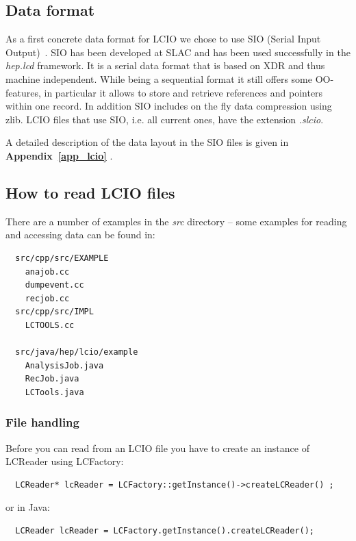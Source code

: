 \documentclass[twoside]{article}
\begin{document}
\subsection{Data format \label{sec_sio}}

As a first concrete data format for LCIO we chose to use SIO (Serial Input Output)~\cite{sio_doc}.
SIO has been developed at SLAC and has been used successfully in the {\em hep.lcd}
framework. It is a serial data format that is based on XDR and thus machine 
independent. While being a sequential format it still offers some OO-features, in 
particular it allows to store and retrieve references and pointers within one record.
In addition SIO includes on the fly data compression using zlib.
LCIO files that use SIO, i.e. all current ones, have the extension {\em .slcio}.

A detailed description of the data layout in the SIO files is given in {\bf Appendix~\ref{app_lcio} }.


\subsection{How to read LCIO files} \label{examples} 
There are a number of examples in the {\em src} directory -- 
some examples for reading and accessing data can be found in:
\begin{verbatim}
  src/cpp/src/EXAMPLE
    anajob.cc
    dumpevent.cc
    recjob.cc
  src/cpp/src/IMPL
    LCTOOLS.cc

  src/java/hep/lcio/example
    AnalysisJob.java
    RecJob.java
    LCTools.java
\end{verbatim}

\subsubsection{File handling} 
Before you can read from an LCIO file you have to create an instance of LCReader using LCFactory:

\begin{verbatim}
  LCReader* lcReader = LCFactory::getInstance()->createLCReader() ;
\end{verbatim}
or in Java:
\begin{verbatim}
  LCReader lcReader = LCFactory.getInstance().createLCReader();
\end{verbatim}
\end{document}
